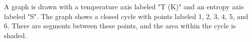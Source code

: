 A graph is drawn with a temperature axis labeled "T (K)" and an entropy axis labeled "S". The graph shows a closed cycle with points labeled 1, 2, 3, 4, 5, and 6. There are segments between these points, and the area within the cycle is shaded.